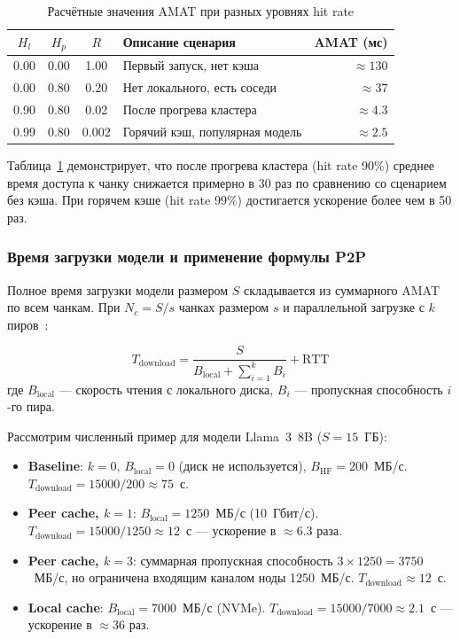 \begin{table}[htbp]
\centering
\caption{Расчётные значения AMAT при разных уровнях hit rate}
\label{tab:amat_calc}
\begin{tabular}{cccp{4cm}r}
\toprule
$H_l$ & $H_p$ & $R$ & Описание сценария & AMAT (мс) \\
\midrule
0.00 & 0.00 & 1.00 & Первый запуск, нет кэша & $\approx 130$ \\
0.00 & 0.80 & 0.20 & Нет локального, есть соседи & $\approx 37$ \\
0.90 & 0.80 & 0.02 & После прогрева кластера & $\approx 4.3$ \\
0.99 & 0.80 & 0.002 & Горячий кэш, популярная модель & $\approx 2.5$ \\
\bottomrule
\end{tabular}
\end{table}

Таблица~\ref{tab:amat_calc} демонстрирует, что после прогрева кластера (hit rate 90\%) среднее время доступа к чанку снижается примерно в 30 раз по сравнению со сценарием без кэша. При горячем кэше (hit rate 99\%) достигается ускорение более чем в 50 раз.

\subsubsection*{Время загрузки модели и применение формулы P2P}

Полное время загрузки модели размером $S$ складывается из суммарного AMAT по всем чанкам. При $N_c = S / s$ чанках размером $s$ и параллельной загрузке с $k$ пиров~\cite{li2020caching}:

\begin{equation}
  T_{\mathrm{download}} = \frac{S}{B_{\mathrm{local}} + \sum_{i=1}^{k} B_i} + \mathrm{RTT}
  \label{eq:p2p}
\end{equation}
где $B_{\mathrm{local}}$ --- скорость чтения с локального диска, $B_i$ --- пропускная способность $i$-го пира.

Рассмотрим численный пример для модели Llama~3~8B ($S = 15$~ГБ):
\begin{itemize}[leftmargin=*]
  \item \textbf{Baseline}: $k = 0$, $B_{\mathrm{local}} = 0$ (диск не используется), $B_{\mathrm{HF}} = 200$~МБ/с. $T_{\mathrm{download}} = 15000 / 200 \approx 75$~с.
  \item \textbf{Peer cache, $k = 1$}: $B_{\mathrm{local}} = 1250$~МБ/с (10~Гбит/с). $T_{\mathrm{download}} = 15000 / 1250 \approx 12$~с --- ускорение в $\approx 6.3$ раза.
  \item \textbf{Peer cache, $k = 3$}: суммарная пропускная способность $3 \times 1250 = 3750$~МБ/с, но ограничена входящим каналом ноды 1250~МБ/с. $T_{\mathrm{download}} \approx 12$~с.
  \item \textbf{Local cache}: $B_{\mathrm{local}} = 7000$~МБ/с (NVMe). $T_{\mathrm{download}} = 15000 / 7000 \approx 2.1$~с --- ускорение в $\approx 36$ раз.
\end{itemize}

